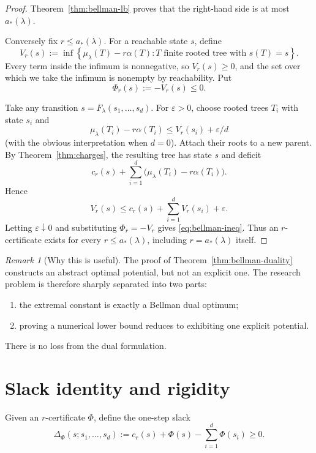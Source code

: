 \documentclass[11pt,a4paper]{article}
\theoremstyle{definition}
\theoremstyle{remark}
\newtheorem{remark}[theorem]{Remark}
\newcommand{\1}{\mathbf 1}
\begin{document}
\begin{proof}
Theorem~\ref{thm:bellman-lb} proves that the right-hand side is at most $a_*(\lambda)$.

Conversely fix $r\le a_*(\lambda)$.  For a reachable state $s$, define
\begin{equation}
  V_r(s)
  :=\inf\left\{
      \mu_\lambda(T)-r\alpha(T):
      T\text{ finite rooted tree with }s(T)=s
    \right\}.
  \label{eq:value}
\end{equation}
Every term inside the infimum is nonnegative, so $V_r(s)\ge0$, and the set over which
we take the infimum is nonempty by reachability.  Put
\[
  \Phi_r(s):=-V_r(s)\le0.
\]

Take any transition $s=F_\lambda(s_1,\dots,s_d)$.  For $\varepsilon>0$, choose rooted
trees $T_i$ with state $s_i$ and
\[
  \mu_\lambda(T_i)-r\alpha(T_i)
  \le V_r(s_i)+\varepsilon/d
\]
(with the obvious interpretation when $d=0$).  Attach their roots to a new parent.
By Theorem~\ref{thm:charges}, the resulting tree has state $s$ and deficit
\[
  c_r(s)+\sum_{i=1}^d
  \bigl(\mu_\lambda(T_i)-r\alpha(T_i)\bigr).
\]
Hence
\[
  V_r(s)
  \le c_r(s)+\sum_{i=1}^d V_r(s_i)+\varepsilon.
\]
Letting $\varepsilon\downarrow0$ and substituting $\Phi_r=-V_r$ gives
\eqref{eq:bellman-ineq}.  Thus an $r$-certificate exists for every $r\le a_*(\lambda)$,
including $r=a_*(\lambda)$ itself.
\end{proof}

\begin{remark}[Why this is useful]
The proof of Theorem~\ref{thm:bellman-duality} constructs an abstract optimal potential,
but not an explicit one.  The research problem is therefore sharply separated into two parts:
\begin{enumerate}[label=(\roman*)]
  \item the extremal constant is exactly a Bellman dual optimum;
  \item proving a numerical lower bound reduces to exhibiting one explicit potential.
\end{enumerate}
There is no loss from the dual formulation.
\end{remark}

\section{Slack identity and rigidity}

Given an $r$-certificate $\Phi$, define the one-step slack
\begin{equation}
  \Delta_\Phi(s;s_1,\dots,s_d)
  :=c_r(s)+\Phi(s)-\sum_{i=1}^d\Phi(s_i)\ge0.
  \label{eq:slack}
\end{equation}
\end{document}
